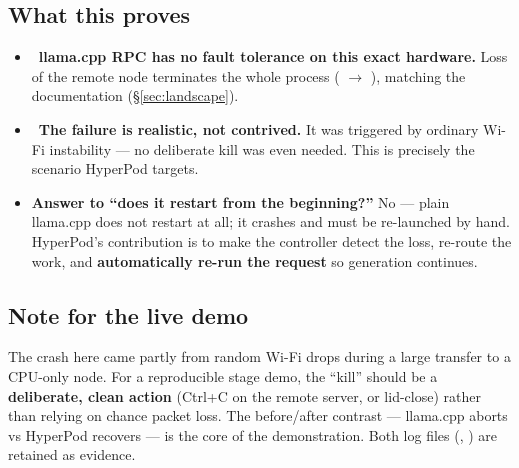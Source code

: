 \subsection{What this proves}
\begin{itemize}[leftmargin=1.4em,nosep]
  \item \VER\ \textbf{llama.cpp RPC has no fault tolerance on this exact
  hardware.} Loss of the remote node terminates the whole process
  ( $\rightarrow$ ), matching the
  documentation (\S\ref{sec:landscape}).
  \item \VER\ \textbf{The failure is realistic, not contrived.} It was triggered
  by ordinary Wi-Fi instability --- no deliberate kill was even needed. This is
  precisely the scenario HyperPod targets.
  \item \textbf{Answer to ``does it restart from the beginning?''} No --- plain
  llama.cpp does not restart at all; it crashes and must be re-launched by hand.
  HyperPod's contribution is to make the controller detect the loss, re-route the
  work, and \textbf{automatically re-run the request} so generation continues.
\end{itemize}

\subsection{Note for the live demo}
The crash here came partly from random Wi-Fi drops during a large transfer to a
CPU-only node. For a reproducible stage demo, the ``kill'' should be a
\textbf{deliberate, clean action} (Ctrl+C on the remote server, or lid-close)
rather than relying on chance packet loss. The before/after contrast ---
llama.cpp aborts vs HyperPod recovers --- is the core of the demonstration. Both
log files (, ) are retained as evidence.

